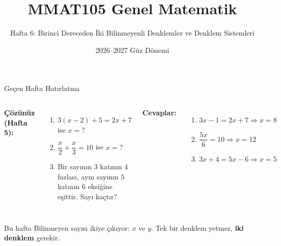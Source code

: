 \documentclass[aspectratio=169,11pt,handout]{beamer}
\title[MMAT105 -- Hafta 6]{MMAT105 Genel Matematik}
\subtitle{Hafta 6: Birinci Dereceden İki Bilinmeyenli Denklemler ve Denklem Sistemleri}
\author{}
\date{2026--2027 Güz Dönemi}
\begin{document}
\begin{frame}
\titlepage
\end{frame}


\begin{frame}{Geçen Hafta Hatırlatma}
\begin{columns}[t]
\textbf{Çözünüz (Hafta 5):}
\begin{enumerate}
\item \(3(x-2)+5=2x+7\) ise \(x=?\)
\item \(\dfrac{x}{2}+\dfrac{x}{3}=10\) ise \(x=?\)
\item Bir sayının \(3\) katının \(4\) fazlası, aynı sayının \(5\) katının \(6\) eksiğine eşittir. Sayı kaçtır?
\end{enumerate}
\pause
\textbf{Cevaplar:}
\begin{enumerate}
\item \(3x-1=2x+7\Rightarrow x=8\)
\item \(\dfrac{5x}{6}=10\Rightarrow x=12\)
\item \(3x+4=5x-6\Rightarrow x=5\)
\end{enumerate}
\end{columns}
\vspace{6pt}
\begin{block}{Bu hafta}
Bilinmeyen sayısı ikiye çıkıyor: \(x\) ve \(y\). Tek bir denklem yetmez, \textbf{iki denklem} gerekir.
\end{block}
\end{frame}
\end{document}
